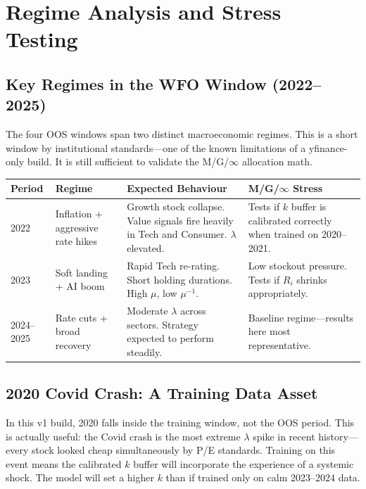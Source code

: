 \documentclass[11pt, oneside]{book}
\begin{document}
\chapter{Regime Analysis and Stress Testing}

\section{Key Regimes in the WFO Window (2022--2025)}

The four OOS windows span two distinct macroeconomic regimes. This is a short window by institutional standards---one of the known limitations of a yfinance-only build. It is still sufficient to validate the M/G/$\infty$ allocation math.

\begin{center}
\begin{tabular}{p{2.2cm}p{3cm}p{3.5cm}p{3.5cm}}
\toprule
\textbf{Period} & \textbf{Regime} & \textbf{Expected Behaviour} & \textbf{M/G/$\infty$ Stress} \\
\midrule
2022 & Inflation + aggressive rate hikes & Growth stock collapse. Value signals fire heavily in Tech and Consumer. $\lambda$ elevated. & Tests if $k$ buffer is calibrated correctly when trained on 2020--2021. \\
2023 & Soft landing + AI boom & Rapid Tech re-rating. Short holding durations. High $\mu$, low $\mu^{-1}$. & Low stockout pressure. Tests if $R_i$ shrinks appropriately. \\
2024--2025 & Rate cuts + broad recovery & Moderate $\lambda$ across sectors. Strategy expected to perform steadily. & Baseline regime---results here most representative. \\
\bottomrule
\end{tabular}
\end{center}

\section{2020 Covid Crash: A Training Data Asset}

In this v1 build, 2020 falls inside the training window, not the OOS period. This is actually useful: the Covid crash is the most extreme $\lambda$ spike in recent history---every stock looked cheap simultaneously by P/E standards. Training on this event means the calibrated $k$ buffer will incorporate the experience of a systemic shock. The model will set a higher $k$ than if trained only on calm 2023--2024 data.
\end{document}
